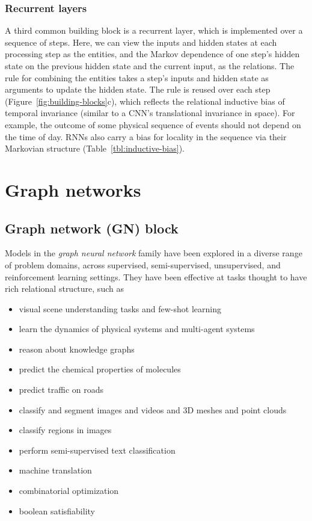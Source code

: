 \documentclass[10pt]{book}
\let\defaultmarginpar\marginpar
\renewcommand\marginpar[2][]{\defaultmarginpar{\itshape\color{gray}#2}}
\begin{document}
\subsubsection{Recurrent layers}

A third common building block is a recurrent layer, which is implemented over a sequence of steps.
Here, we can view the inputs and hidden states at each processing step as the entities, and the Markov dependence of one step's hidden state on the previous hidden state and the current input, as the relations.
The rule for combining the entities takes a step's inputs and hidden state as arguments to update the hidden state. The rule is reused over each step (Figure~\ref{fig:building-blocks}c), which reflects the relational inductive bias of temporal invariance (similar to a CNN's translational invariance in space). 
For example, the outcome of some physical sequence of events should not depend on the time of day.
RNNs also carry a bias for locality in the sequence via their Markovian structure (Table~\ref{tbl:inductive-bias}).

\section{Graph networks}
\label{sec:model}

\subsection{Graph network (GN) block}
\label{sec:model-computational}

Models in the \emph{graph neural network}\marginpar{graph neural networks} family have been explored in a diverse range of problem domains, across supervised, semi-supervised, unsupervised, and reinforcement learning settings. They have been effective at tasks thought to have rich relational structure, such as
\begin{itemize}
    \item visual scene understanding tasks and few-shot learning
    \item learn the dynamics of physical systems and multi-agent systems 
    \item reason about knowledge graphs
    \item predict the chemical properties of molecules
    \item predict traffic on roads
    \item classify and segment images and videos and 3D meshes and point clouds
    \item classify regions in images
    \item perform semi-supervised text classification
    \item machine translation
    \item combinatorial optimization
    \item boolean satisfiability
\end{itemize}
\end{document}
